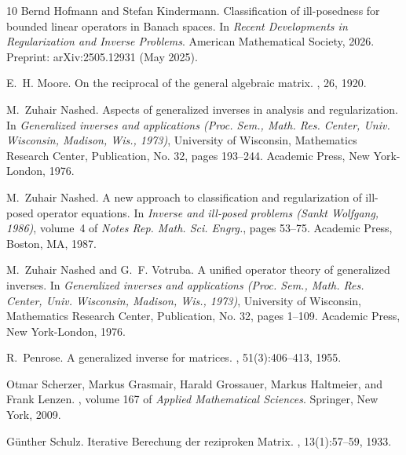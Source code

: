 \documentclass[12pt]{amsart}
\theoremstyle{remark}
\begin{document}
\begin{thebibliography}{10}
Bernd Hofmann and Stefan Kindermann.
\newblock Classification of ill-posedness for bounded linear operators in
  {B}anach spaces.
\newblock In {\em Recent Developments in Regularization and Inverse Problems}.
  American Mathematical Society, 2026.
\newblock Preprint: arXiv:2505.12931 (May 2025).

E.~H. Moore.
\newblock On the reciprocal of the general algebraic matrix.
, 26, 1920.

M.~Zuhair Nashed.
\newblock Aspects of generalized inverses in analysis and regularization.
\newblock In {\em Generalized inverses and applications ({P}roc. {S}em.,
  {M}ath. {R}es. {C}enter, {U}niv. {W}isconsin, {M}adison, {W}is., 1973)},
  University of Wisconsin, Mathematics Research Center, Publication, No. 32,
  pages 193--244. Academic Press, New York-London, 1976.

M.~Zuhair Nashed.
\newblock A new approach to classification and regularization of ill-posed
  operator equations.
\newblock In {\em Inverse and ill-posed problems ({S}ankt {W}olfgang, 1986)},
  volume~4 of {\em Notes Rep. Math. Sci. Engrg.}, pages 53--75. Academic Press,
  Boston, MA, 1987.

M.~Zuhair Nashed and G.~F. Votruba.
\newblock A unified operator theory of generalized inverses.
\newblock In {\em Generalized inverses and applications ({P}roc. {S}em.,
  {M}ath. {R}es. {C}enter, {U}niv. {W}isconsin, {M}adison, {W}is., 1973)},
  University of Wisconsin, Mathematics Research Center, Publication, No. 32,
  pages 1--109. Academic Press, New York-London, 1976.

R.~Penrose.
\newblock A generalized inverse for matrices.
,
  51(3):406–413, 1955.

Otmar Scherzer, Markus Grasmair, Harald Grossauer, Markus Haltmeier, and Frank
  Lenzen.
, volume 167 of {\em Applied
  Mathematical Sciences}.
\newblock Springer, New York, 2009.

Günther Schulz.
\newblock Iterative {B}erechung der reziproken {M}atrix.
, 13(1):57--59, 1933.


\end{thebibliography}
\end{document}
